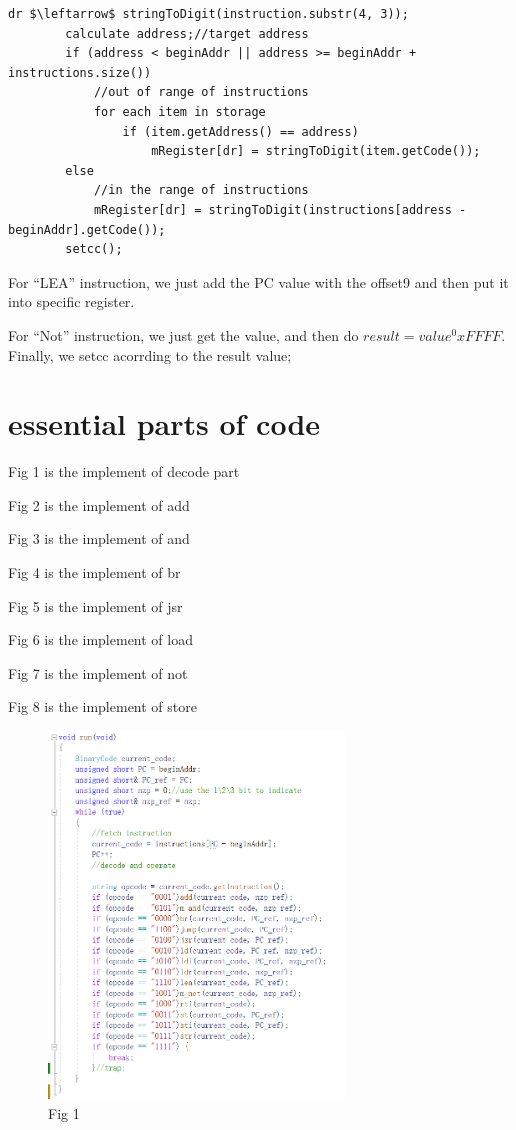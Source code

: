 \documentclass[twoside]{article}
\begin{document}
\begin{CJK*}{UTF8}{gbsn}
	\begin{lstlisting}[mathescape=true]
		dr $\leftarrow$ stringToDigit(instruction.substr(4, 3));
		calculate address;//target address
		if (address < beginAddr || address >= beginAddr + instructions.size()) 
			//out of range of instructions
			for each item in storage
				if (item.getAddress() == address) 
					mRegister[dr] = stringToDigit(item.getCode());
		else 
			//in the range of instructions
			mRegister[dr] = stringToDigit(instructions[address - beginAddr].getCode());
		setcc();
	\end{lstlisting}


	For ``LEA'' instruction, we just add the PC value with the offset9 and then put it into specific register.
	
	For ``Not'' instruction, we just get the value, and then do $result = value ^ 0xFFFF$. Finally, we setcc acorrding to the result value;
	
	
	\section{essential parts of code}
	Fig 1 is the implement of decode part
	
	Fig 2 is the implement of add
	
	Fig 3 is the implement of and
	
	Fig 4 is the implement of br
	
	Fig 5 is the implement of jsr
	
	
	Fig 6 is the implement of load
	
	Fig 7 is the implement of not
	
	Fig 8 is the implement of store
	\begin{figure}[htbp]
		\small
		\centering
		\includegraphics[width=0.7\textwidth]{decode and run.png}
		\caption{Fig 1} %
	\end{figure}
	

\end{CJK*}
\end{document}
